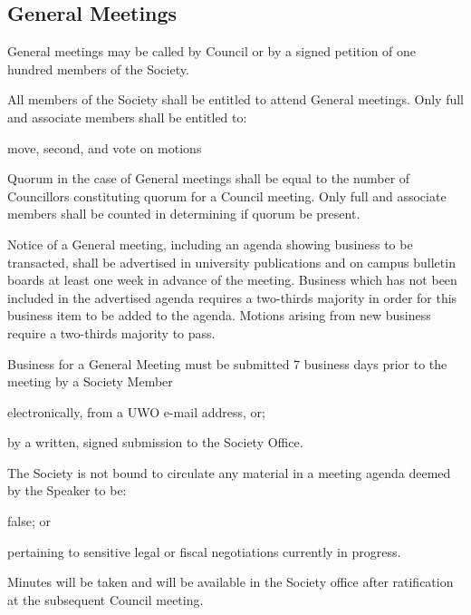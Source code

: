 \subsection{General Meetings}
\begin{longenum}[ label*=\thesubsection.\arabic*., align=left] 
	\item General meetings may be called by Council or by a signed petition of one hundred members of the Society.
    \item All members of the Society shall be entitled to attend General meetings. Only full and associate members  shall be entitled to:
    \begin{longenum}[ label*=\arabic*., align=left]
		\item move, second, and vote on motions
	\end{longenum}
    \item Quorum in the case of General meetings shall be equal to the number of Councillors constituting quorum for a Council meeting. Only full and associate members shall be counted in determining if quorum be present.
    \item Notice of a General meeting, including an agenda showing business to be transacted, shall be advertised in university publications and on campus bulletin boards at least one week in advance of the meeting. Business which has not been included in the advertised agenda requires a two-thirds majority in order for this business item to be 
added to the agenda. Motions arising from new business require a two-thirds majority to pass.
	\item  Business for a General Meeting must be submitted 7 business days prior to the meeting by a Society Member 
    \begin{longenum}[ label*=\arabic*., align=left]
		\item electronically, from a UWO e-mail address, or;
        \item by a written, signed submission to the Society Office.
	\end{longenum}
    \item The Society is not bound to circulate any material in a meeting agenda deemed by the Speaker to be:
    \begin{longenum}[ label*=\arabic*., align=left]
		\item false; or
        \item pertaining to sensitive legal or fiscal negotiations currently in progress.
	\end{longenum}
    \item Minutes will be taken and will be available in the Society office after ratification at the subsequent Council meeting.

\end{longenum}
